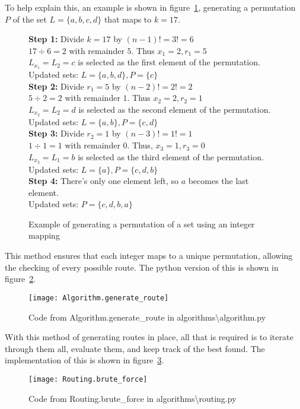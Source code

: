 \noindent
To help explain this, an example is shown in figure~\ref{fig:permutation-calculation-example}, generating a
permutation $P$ of the set $L = \{a, b, c, d\}$ that maps to $k = 17$.
\begin{figure}[H]
    \textbf{Step 1:} Divide $k = 17$ by $(n-1)! = 3! = 6$\\
    $17 \div 6 = 2$ with remainder $5$. Thus $x_1 = 2, r_1 = 5$\\
    $L_{x_1} = L_2 = c$ is selected as the first element of the permutation.\\
    Updated sets: $L = \{a, b, d\}, P = \{c\}$\\

    \textbf{Step 2:} Divide $r_1 = 5$ by $(n-2)! = 2! = 2$\\
    $5 \div 2 = 2$ with remainder $1$. Thus $x_2 = 2, r_2 = 1$\\
    $L_{x_2} = L_2 = d$ is selected as the second element of the permutation.\\
    Updated sets: $L = \{a, b\}, P = \{c, d\}$\\

    \textbf{Step 3:} Divide $r_2 = 1$ by $(n-3)! = 1! = 1$\\
    $1 \div 1 = 1$ with remainder $0$. Thus, $x_3 = 1, r_3 = 0$\\
    $L_{x_3} = L_1 = b$ is selected as the third element of the permutation.\\
    Updated sets: $L = \{a\}, P = \{c, d, b\}$\\

    \textbf{Step 4:} There's only one element left, so $a$ becomes the last element.\\
    Updated sets: $P = \{c, d, b, a\}$
    \caption{Example of generating a permutation of a set using an integer mapping}
    \label{fig:permutation-calculation-example}
\end{figure}

\noindent
This method ensures that each integer maps to a unique permutation, allowing the checking of every possible route.
The python version of this is shown in figure~\ref{fig:Algorithm.generate_route}.
\begin{figure}[H]
    \centering
    \texttt{[image: Algorithm.generate\_route]}
    \caption{Code from Algorithm.generate\_route in algorithms\textbackslash algorithm.py}
    \label{fig:Algorithm.generate_route}
\end{figure}

\noindent
With this method of generating routes in place, all that is required is to iterate through them all, evaluate them, and
keep track of the best found.
The implementation of this is shown in figure~\ref{fig:Routing.brute_force}.
\begin{figure}[H]
    \centering
    \texttt{[image: Routing.brute\_force]}
    \caption{Code from Routing.brute\_force in algorithms\textbackslash routing.py}
    \label{fig:Routing.brute_force}
\end{figure}

